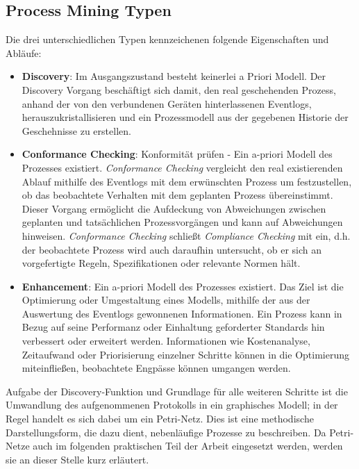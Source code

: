 \newpage
\subsection{Process Mining Typen}
Die drei unterschiedlichen Typen kennzeichenen folgende Eigenschaften und Abläufe:
\begin{itemize}
\item \textbf{Discovery}: Im Ausgangszustand besteht keinerlei a Priori Modell. Der Discovery Vorgang beschäftigt sich damit, den real geschehenden Prozess, anhand der von den verbundenen Geräten hinterlassenen Eventlogs, herauszukristallisieren und ein Prozessmodell aus der gegebenen Historie der Geschehnisse zu erstellen.

\item \textbf{Conformance Checking}: Konformität prüfen - Ein a-priori Modell des Prozesses existiert. \textit{Conformance Checking} vergleicht den real existierenden Ablauf mithilfe des Eventlogs mit dem erwünschten Prozess um festzustellen, ob das beobachtete Verhalten mit dem geplanten Prozess übereinstimmt. Dieser Vorgang ermöglicht die Aufdeckung von Abweichungen zwischen geplanten und tatsächlichen Prozessvorgängen und kann auf Abweichungen hinweisen.  \textit{Conformance Checking} schließt \textit{Compliance Checking} mit ein, d.h. der beobachtete Prozess wird auch daraufhin untersucht, ob er sich an vorgefertigte Regeln, Spezifikationen oder relevante Normen hält.

\item \textbf{Enhancement}: Ein a-priori Modell des Prozesses existiert. Das Ziel ist die Optimierung oder Umgestaltung eines Modells, mithilfe der aus der Auswertung des Eventlogs gewonnenen Informationen. Ein Prozess kann in Bezug auf seine Performanz oder Einhaltung geforderter Standards hin verbessert oder erweitert werden. Informationen wie Kostenanalyse, Zeitaufwand oder Priorisierung einzelner Schritte können in die Optimierung miteinfließen, beobachtete Engpässe können umgangen werden.
\end{itemize}

Aufgabe der Discovery-Funktion und Grundlage für alle weiteren Schritte ist die Umwandlung des aufgenommenen Protokolls in ein graphisches Modell; in der Regel handelt es sich dabei um ein Petri-Netz. Dies ist eine methodische Darstellungsform, die dazu dient, nebenläufige Prozesse zu beschreiben. Da Petri-Netze auch im folgenden praktischen Teil der Arbeit eingesetzt werden, werden sie an dieser Stelle kurz erläutert.

